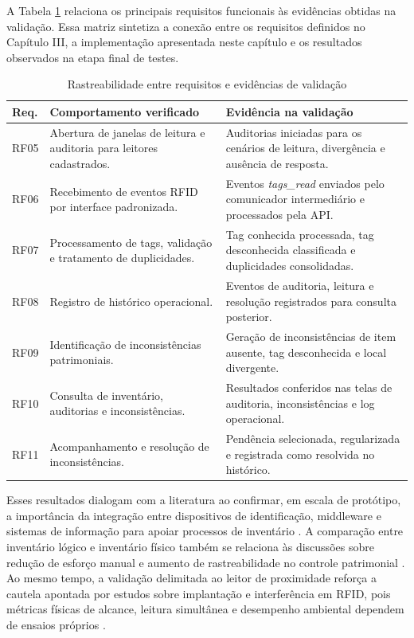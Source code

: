 A Tabela \ref{tab:rastreabilidade-validacao} relaciona os principais requisitos funcionais às evidências obtidas na validação. Essa matriz sintetiza a conexão entre os requisitos definidos no Capítulo III, a implementação apresentada neste capítulo e os resultados observados na etapa final de testes.

\begin{table}[H]
\centering
\scriptsize
\setlength{\tabcolsep}{3pt}
\renewcommand{\arraystretch}{1.12}
\caption{Rastreabilidade entre requisitos e evidências de validação}
\label{tab:rastreabilidade-validacao}
\begin{tabularx}{\textwidth}{>{\raggedright\arraybackslash}p{1.4cm}>{\raggedright\arraybackslash}X>{\raggedright\arraybackslash}p{4.2cm}}
\toprule
\textbf{Req.} & \textbf{Comportamento verificado} & \textbf{Evidência na validação} \\
\midrule
RF05 & Abertura de janelas de leitura e auditoria para leitores cadastrados. & Auditorias iniciadas para os cenários de leitura, divergência e ausência de resposta. \\
RF06 & Recebimento de eventos RFID por interface padronizada. & Eventos \textit{tags\_read} enviados pelo comunicador intermediário e processados pela API. \\
RF07 & Processamento de tags, validação e tratamento de duplicidades. & Tag conhecida processada, tag desconhecida classificada e duplicidades consolidadas. \\
RF08 & Registro de histórico operacional. & Eventos de auditoria, leitura e resolução registrados para consulta posterior. \\
RF09 & Identificação de inconsistências patrimoniais. & Geração de inconsistências de item ausente, tag desconhecida e local divergente. \\
RF10 & Consulta de inventário, auditorias e inconsistências. & Resultados conferidos nas telas de auditoria, inconsistências e log operacional. \\
RF11 & Acompanhamento e resolução de inconsistências. & Pendência selecionada, regularizada e registrada como resolvida no histórico. \\
\bottomrule
\end{tabularx}
\end{table}
\normalsize
\renewcommand{\arraystretch}{1}

Esses resultados dialogam com a literatura ao confirmar, em escala de protótipo, a importância da integração entre dispositivos de identificação, middleware e sistemas de informação para apoiar processos de inventário \cite{alwadi2017,razzaque2015}. A comparação entre inventário lógico e inventário físico também se relaciona às discussões sobre redução de esforço manual e aumento de rastreabilidade no controle patrimonial \cite{brito2019,mashayekhy2022}. Ao mesmo tempo, a validação delimitada ao leitor de proximidade reforça a cautela apontada por estudos sobre implantação e interferência em RFID, pois métricas físicas de alcance, leitura simultânea e desempenho ambiental dependem de ensaios próprios \cite{ting2013,knapp2022}.

